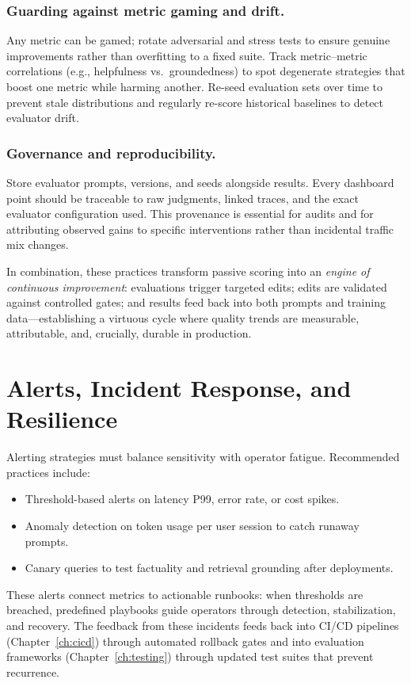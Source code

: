 \subsubsection{Guarding against metric gaming and drift.}
Any metric can be gamed; rotate adversarial and stress tests to ensure genuine improvements rather than overfitting to a fixed suite. Track metric–metric correlations (e.g., helpfulness vs.\ groundedness) to spot degenerate strategies that boost one metric while harming another. Re-seed evaluation sets over time to prevent stale distributions and regularly re-score historical baselines to detect evaluator drift.

\subsubsection{Governance and reproducibility.}
Store evaluator prompts, versions, and seeds alongside results. Every dashboard point should be traceable to raw judgments, linked traces, and the exact evaluator configuration used. This provenance is essential for audits and for attributing observed gains to specific interventions rather than incidental traffic mix changes.

In combination, these practices transform passive scoring into an \emph{engine of continuous improvement}: evaluations trigger targeted edits; edits are validated against controlled gates; and results feed back into both prompts and training data—establishing a virtuous cycle where quality trends are measurable, attributable, and, crucially, durable in production.

\section{Alerts, Incident Response, and Resilience}
\label{sec:alerts-incident-response-and-resilience}
Alerting strategies must balance sensitivity with operator fatigue. Recommended practices include:
\begin{itemize}
    \item Threshold-based alerts on latency P99, error rate, or cost spikes.
    \item Anomaly detection on token usage per user session to catch runaway prompts.
    \item Canary queries to test factuality and retrieval grounding after deployments.
\end{itemize}

These alerts connect metrics to actionable runbooks: when thresholds are breached, predefined playbooks guide operators through detection, stabilization, and recovery. The feedback from these incidents feeds back into CI/CD pipelines (Chapter~\ref{ch:cicd}) through automated rollback gates and into evaluation frameworks (Chapter~\ref{ch:testing}) through updated test suites that prevent recurrence.

